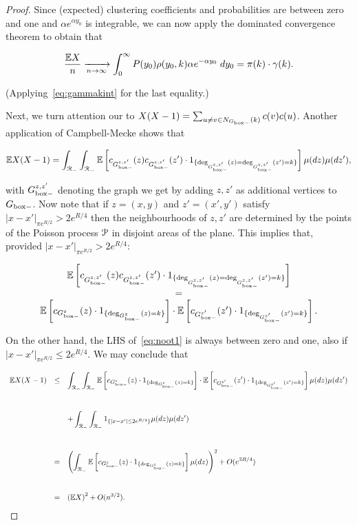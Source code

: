 \begin{proof}
Since (expected) clustering coefficients and probabilities are between zero and one and $\alpha e^{\alpha y_0}$ is integrable, we can now apply the dominated 
convergence theorem to obtain that 

\begin{equation}\label{eq:EXn} 
\frac{{\mathbb E} X}{n} \xrightarrow[n\to\infty]{} \int_0^\infty P(y_0) \rho(y_0,k)\alpha e^{-\alpha y_0}\;dy_0 = {\pi}(k) \cdot \gamma(k).  
\end{equation}

\noindent
(Applying~\eqref{eq:gammakint} for the last equality.)

Next, we turn attention our to $X(X-1) = \sum_{u\neq v \in N_{G_{\mathrm{box}-}}(k)} c(v)c(u)$.
Another application of Campbell-Mecke shows that 

$$
{\mathbb E} X(X-1) 
= 
\int_{{\mathcal R}_-}\int_{{\mathcal R}_-} {\mathbb E}\left[ c_{G_{\mathrm{box}-}^{z,z'}}(z)c_{G_{\mathrm{box}-}^{z,z'}}(z') \cdot 
1_{\{\text{deg}_{G_{\mathrm{box}-}^{z,z'}}(z)=\text{deg}_{G_{\mathrm{box}-}^{z,z'}}(z')=k\}}\right]\mu(dz)\mu(dz'),
$$

\noindent
with $G_{\mathrm{box}-}^{z,z'}$ denoting the graph we get by adding $z, z'$ as additional vertices to $G_{\mathrm{box}-}$.
Now note that if $z=(x,y)$ and $z'=(x',y')$ satisfy $|x-x'|_{\pi e^{R/2}} > 2 e^{R/4}$ then 
the neighbourhoods of $z,z'$ are determined by the points of the Poisson process ${\mathcal P}$ in disjoint areas
of the plane.
This implies that, provided $|x-x'|_{\pi e^{R/2}} > 2 e^{R/4}$:

\begin{equation}\label{eq:noot1} 
\begin{array}{c} 
{\mathbb E}\left[ c_{G_{\mathrm{box}-}^{z,z'}}(z)c_{G_{\mathrm{box}-}^{z,z'}}(z') \cdot 
1_{\{\text{deg}_{G_{\mathrm{box}-}^{z,z'}}(z)=\text{deg}_{G_{\mathrm{box}-}^{z,z'}}(z')=k\}}\right] \\
= \\
{\mathbb E}\left[ c_{G_{\mathrm{box}-}^{z}}(z) \cdot 
1_{\{\text{deg}_{G_{\mathrm{box}-}^{z}}(z)=k\}}\right] \cdot 
{\mathbb E}\left[ c_{G_{\mathrm{box}-}^{z'}}(z') \cdot 
1_{\{\text{deg}_{G_{\mathrm{box}-}^{z'}}(z')=k\}}\right].
\end{array} 
\end{equation}

\noindent
On the other hand, the LHS of~\eqref{eq:noot1} is always between zero and one, also if $|x-x'|_{\pi e^{R/2}} \leq 2 e^{R/4}$. 
We may conclude that 

$$ \begin{array}{rcl} 
\Ee X(X-1) 
& \leq & \displaystyle  
\int_{\Rcal_-}\int_{\Rcal_-} \Ee\left[ c_{\GboxH^{z}}(z) \cdot 
1_{\{\text{deg}_{\GboxH^{z}}(z)=k\}}\right] %
\cdot 
\Ee\left[ c_{\GboxH^{z'}}(z') \cdot 
1_{\{\text{deg}_{\GboxH^{z'}}(z')=k\}}\right] \mu(dz)\mu(dz') \\[8ex]
& & \displaystyle 
+ \int_{\Rcal_-}\int_{\Rcal_-} 1_{\{|x-x'|\leq 2e^{R/4}\}} \mu(dz)\mu(dz') \\[8ex]
& = & \displaystyle
\left( \int_{\Rcal_-} \Ee\left[ c_{\GboxH^z}(z) \cdot 1_{\{\text{deg}_{\GboxH^z}(z)=k\}}\right] \mu(dz) \right)^2
+ O( e^{3R/4} ) \\[8ex] 
& = & \displaystyle
\left(\Ee X\right)^2 + O( n^{3/2} ).
\end{array} $$


\end{proof}
